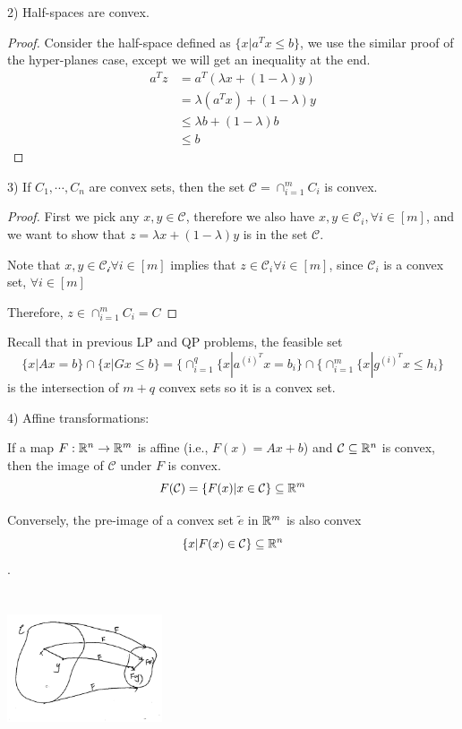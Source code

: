 2) Half-spaces are convex.
\begin{proof}
Consider the half-space defined as $\{x| a^Tx \leq b \}$, we use the similar proof of the hyper-planes case, except we will get an inequality at the end.
\begin{align*}
a^Tz &= a^T(\lambda x + (1-\lambda)y)\\
&= \lambda(a^Tx) + (1-\lambda)y\\
&\leq \lambda b + (1-\lambda)b\\
&\leq b
\end{align*}	
\end{proof}

3) If $C_1, \cdots, C_n$ are convex sets, then the set $\mathcal{C} = \cap^m_{i=1} C_i$ is convex.
\begin{proof}
First we pick any $x,y\in \mathcal{C}$, therefore we also have $x,y\in \mathcal{C}_i,\forall i\in [m]$, and we want to show that $z = \lambda x + (1 - \lambda)y$ is in the set $\mathcal{C}$.
		
Note that $x,y \in \mathcal{C_i} \forall i\in[m]$ implies that $z\in \mathcal{C}_i\forall i\in [m]$, since $\mathcal{C}_i$ is a convex set, $\forall i\in [m]$
		
Therefore,  $z\in \cap^m_{i=1}C_i = C$		
\end{proof}


Recall that in previous LP and QP problems, the feasible set 
$$\{x|Ax = b \}\cap \{x|Gx\leq b \} = \{\cap^q_{i=1}\{x|a^{(i)^T}x = b_i  \}\cap \{\cap^m_{i=1}\{x|g^{(i)^T}x \leq h_i \}$$
is the intersection of $m+q$ convex sets so it is a convex set.


4) Affine transformations:
	
If a map $F: \mathbb{R}^n \rightarrow \mathbb{R}^m$ is affine (i.e., $F(x) = Ax + b$) and $\mathcal{C} \subseteq \mathbb{R}^n$ is convex, then the image of $\mathcal{C}$ under $F$ is convex.
$$F(\mathcal{C}) = \{F(x) | x\in \mathcal{C} \} \subseteq \mathbb{R}^m$$

Conversely, the pre-image of a convex set $\tilde{e}$ in $\mathbb{R}^m$ is also convex
$$\{x|F(x)\in \mathcal{C} \} \subseteq \mathbb{R}^n$$.


\begin{marginfigure}
	\centering
	\includegraphics[width=1.8in,height=1.8in]{figures/ch08/figure1023_5.png}
\end{marginfigure}


